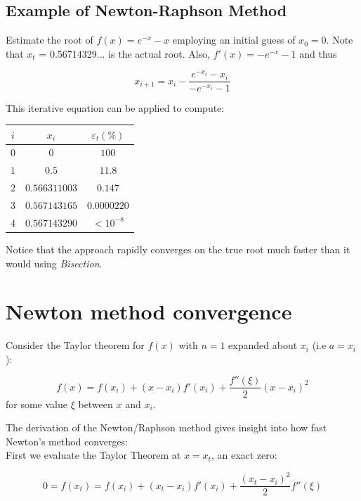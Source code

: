 \documentclass [titlepage,12pt,letter] {article}
\begin{document}
\subsection{Example of Newton-Raphson Method} 

Estimate the root of $f(x) = e^{-x} -x$ employing an initial guess of
$x_0 = 0$. 
Note that $x_t$ = 0.56714329... is the actual root. Also, $f'(x) = -e^{-x} - 1$ and thus

\begin{equation}
x_{i+1} = x_i - \frac{e^{-x_i} - x_i}{-e^{-x_i}-1}
\end{equation}

\noindent
This iterative equation can be applied to compute: 

\begin{table}[h]
\begin{tabular}{c|c|c} 
$i$ & $x_i$ & $\varepsilon_t(\%)$ \\ 
\hline 
$0$ & $0$ & $100$ \\
$1$ & $0.5$ & $11.8$ \\ 
$2$ & $0.566311003$ & $0.147$ \\
$3$ & $0.567143165$ & $0.0000220$ \\ 
$4$ & $0.567143290$ & $<10^{-8}$ \\  
\hline
\end{tabular} 
\end{table} 
\noindent 
Notice that the approach rapidly converges on the true root much faster than 
it would using {\it Bisection}. 

\section{Newton method convergence}

Consider the Taylor theorem for $f(x)$ with $n=1$ expanded about
$x_i$ (i.e $a = x_i$): 

\begin{equation} 
f(x) = f(x_i) + (x-x_i) f'(x_i) + \frac{f''(\xi)}{2}(x-x_i)^2
\end{equation}
\noindent 
for some value $\xi$ between $x$ and $x_i$. 

The derivation of the Newton/Raphson method gives insight into how
fast Newton's method converges:
\\
First we evaluate the Taylor Theorem at $x=x_t$, an exact zero: 

\begin{equation} 
0 = f(x_t) = f(x_i) + (x_t-x_i)f'(x_i) + \frac{(x_t-x_i)^2}{2}f''(\xi)
\end{equation} 
\end{document}

